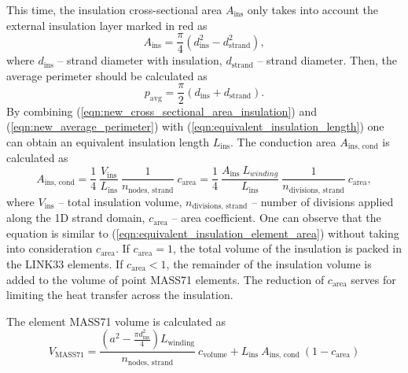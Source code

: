 This time, the insulation cross-sectional area $A_\text{ins}$ only takes into account the external insulation layer marked in red as
\begin{equation}
    A_\text{ins} = \frac{\pi}{4} \left( d^2_\text{ins} - d^2_\text{strand} \right),
    \label{eqn:new_cross_sectional_area_insulation}
\end{equation}
where $d_\text{ins}$ -- strand diameter with insulation, $d_\text{strand}$ -- strand diameter. Then, the average perimeter should be calculated as
\begin{equation}
    p_\text{avg} =  \frac{\pi}{2} \left( d_\text{ins} + d_\text{strand} \right).
    \label{eqn:new_average_perimeter}
\end{equation}
By combining (\ref{eqn:new_cross_sectional_area_insulation}) and (\ref{eqn:new_average_perimeter}) with (\ref{eqn:equivalent_insulation_length}) one can obtain an equivalent insulation length $L_\text{ins}$. The conduction area $A_\text{ins, cond}$ is calculated as 
\begin{equation}
    A_\text{ins, cond} = \frac{1}{4}~\frac{ V_\text{ins}}{L_\text{ins}}~\frac{1}{n_\text{nodes, strand}}~c_\text{area} = \frac{1}{4}~\frac{ A_\text{ins} ~ L_{winding}}{L_\text{ins}}~\frac{1}{n_\text{divisions, strand}}~c_\text{area},
    \label{eqn:new_equivalent_insulation_element_area}
\end{equation}
where $V_\text{ins}$ -- total insulation volume, $n_\text{divisions, strand}$ -- number of divisions applied along the 1D strand domain, $c_\text{area}$ -- area coefficient. One can observe that the equation is similar to (\ref{eqn:equivalent_insulation_element_area}) without taking into consideration $c_\text{area}$. If $c_\text{area} = 1$, the total volume of the insulation is packed in the LINK33 elements. If $c_\text{area} < 1$, the remainder of the insulation volume is added to the volume of point MASS71 elements. The reduction of $c_\text{area}$ serves for limiting the heat transfer across the insulation. 

The element MASS71 volume is calculated as 
\begin{equation}
    V_\text{MASS71} = \frac{\left( a^2 - \frac{\pi d_\text{ins}^2}{4} \right) L_\text{winding}}{n_\text{nodes, strand}}~c_\text{volume} + L_\text{ins}~A_\text{ins, cond} ~ \left( 1-c_\text{area} \right)
    \label{eqn:mass71_volume_element}
\end{equation}

